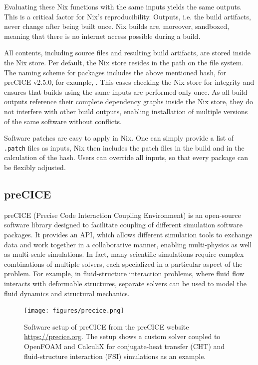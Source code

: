 \documentclass{eceasst}
\begin{document}
Evaluating these Nix functions with the same inputs yields the same outputs.
This is a critical factor for Nix's reproducibility.
Outputs, i.e. the build artifacts, never change after being built once.
Nix builds are, moreover, sandboxed, meaning that there is no internet access possible during a build.

All contents, including source files and resulting build artifacts, are stored inside the Nix store.
Per default, the Nix store resides in the path  on the file system.
The naming scheme for packages includes the above mentioned hash, for preCICE v2.5.0, for example,
.
This eases checking the Nix store for integrity and ensures that builds using the same inputs are performed only once.
As all build outputs reference their complete dependency graphs inside the Nix store, they do not interfere with other build outputs, enabling installation of multiple versions of the same software without conflicts.

Software patches are easy to apply in Nix.
One can simply provide a list of \texttt{.patch} files as inputs, Nix then includes the patch files in the build and in the calculation of the hash.
Users can override all inputs, so that every package can be flexibly adjusted.


\subsection{preCICE}

preCICE (Precise Code Interaction Coupling Environment) is an open-source software library designed to facilitate coupling of different simulation software packages.
It provides an API, which allows different simulation tools to exchange data and work together in a collaborative manner, enabling multi-physics as well as multi-scale simulations.
In fact, many scientific simulations require complex combinations of multiple solvers, each specialized in a particular aspect of the problem.
For example, in fluid-structure interaction problems, where fluid flow interacts with deformable structures, separate solvers can be used to model the fluid dynamics and structural mechanics.

\begin{figure}
    \centering
    \texttt{[image: figures/precice.png]}
    \caption{Software setup of preCICE from the preCICE website \url{https://precice.org}. The setup shows a custom solver coupled to OpenFOAM and CalculiX for conjugate-heat transfer (CHT) and fluid-structure interaction (FSI) simulations as an example.}
    \label{fig:precice}
\end{figure}
\end{document}
